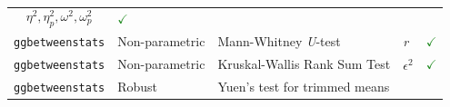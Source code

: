 \documentclass[]{article}
\begin{document}
\begin{longtable}[]{@{}lllll@{}}
\begin{minipage}[t]{0.12\columnwidth}
\[\eta^2, \eta^2_p, \omega^2, \omega^2_p\]\strut
\end{minipage} & \begin{minipage}[t]{0.07\columnwidth}\raggedright
\textcolor{ForestGreen}{$\checkmark$}\strut
\end{minipage}\tabularnewline
\begin{minipage}[t]{0.20\columnwidth}\raggedright
\texttt{ggbetweenstats}\strut
\end{minipage} & \begin{minipage}[t]{0.16\columnwidth}\raggedright
Non-parametric\strut
\end{minipage} & \begin{minipage}[t]{0.31\columnwidth}\raggedright
Mann-Whitney \emph{U}-test\strut
\end{minipage} & \begin{minipage}[t]{0.12\columnwidth}\raggedright
\emph{r}\strut
\end{minipage} & \begin{minipage}[t]{0.07\columnwidth}\raggedright
\textcolor{ForestGreen}{$\checkmark$}\strut
\end{minipage}\tabularnewline
\begin{minipage}[t]{0.20\columnwidth}\raggedright
\texttt{ggbetweenstats}\strut
\end{minipage} & \begin{minipage}[t]{0.16\columnwidth}\raggedright
Non-parametric\strut
\end{minipage} & \begin{minipage}[t]{0.31\columnwidth}\raggedright
Kruskal-Wallis Rank Sum Test\strut
\end{minipage} & \begin{minipage}[t]{0.12\columnwidth}\raggedright
\[\epsilon^2\]\strut
\end{minipage} & \begin{minipage}[t]{0.07\columnwidth}\raggedright
\textcolor{ForestGreen}{$\checkmark$}\strut
\end{minipage}\tabularnewline
\begin{minipage}[t]{0.20\columnwidth}\raggedright
\texttt{ggbetweenstats}\strut
\end{minipage} & \begin{minipage}[t]{0.16\columnwidth}\raggedright
Robust\strut
\end{minipage} & \begin{minipage}[t]{0.31\columnwidth}\raggedright
Yuen's test for trimmed means\strut
\end{minipage} & \begin{minipage}[t]{0.12\columnwidth}\raggedright

\end{minipage}
\end{longtable}
\end{document}
